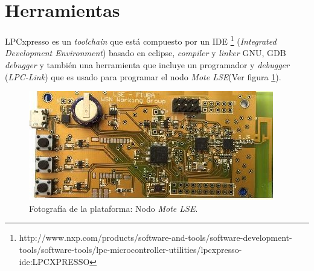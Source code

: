 \section{Herramientas}
\label{sec:herramientas}

LPCxpresso es un \textit{toolchain} que está compuesto por un IDE \footnote{http://www.nxp.com/products/software-and-tools/software-development-tools/software-tools/lpc-microcontroller-utilities/lpcxpresso-ide:LPCXPRESSO} (\textit{Integrated Development Environment}) basado en eclipse, \textit{compiler} y \textit{linker} GNU, GDB \textit{debugger} y también una herramienta que incluye un programador y \textit{debugger} (\textit{LPC-Link}) que es usado para programar el nodo \textit{Mote LSE}(Ver figura \ref{fig:mote}).

\vspace{10px}

\begin{figure}[h!]
	\centering
    \includegraphics[width=.8\textwidth]{./Figures/mote.jpg}
    	\caption{Fotografía de la plataforma: Nodo \textit{Mote LSE}.}
	\label{fig:mote}
\end{figure}

